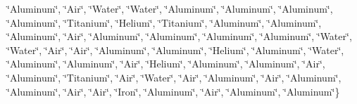\begin{DoxyCompactItemize}
\char`\"{}Aluminum\char`\"{}, \char`\"{}Air\char`\"{}, \char`\"{}Water\char`\"{}, \char`\"{}Water\char`\"{}, \char`\"{}Aluminum\char`\"{}, \char`\"{}Aluminum\char`\"{}, \char`\"{}Aluminum\char`\"{}, \char`\"{}Aluminum\char`\"{}, \char`\"{}Titanium\char`\"{}, \char`\"{}Helium\char`\"{}, \char`\"{}Titanium\char`\"{}, \char`\"{}Aluminum\char`\"{}, \char`\"{}Aluminum\char`\"{}, \char`\"{}Aluminum\char`\"{}, \char`\"{}Air\char`\"{}, \char`\"{}Aluminum\char`\"{}, \char`\"{}Aluminum\char`\"{}, \char`\"{}Aluminum\char`\"{}, \char`\"{}Aluminum\char`\"{}, \char`\"{}Water\char`\"{}, \char`\"{}Water\char`\"{}, \char`\"{}Air\char`\"{}, \char`\"{}Air\char`\"{}, \char`\"{}Aluminum\char`\"{}, \char`\"{}Aluminum\char`\"{}, \char`\"{}Helium\char`\"{}, \char`\"{}Aluminum\char`\"{}, \char`\"{}Water\char`\"{}, \char`\"{}Aluminum\char`\"{}, \char`\"{}Aluminum\char`\"{}, \char`\"{}Air\char`\"{}, \char`\"{}Helium\char`\"{}, \char`\"{}Aluminum\char`\"{}, \char`\"{}Aluminum\char`\"{}, \char`\"{}Air\char`\"{}, \char`\"{}Aluminum\char`\"{}, \char`\"{}Titanium\char`\"{}, \char`\"{}Air\char`\"{}, \char`\"{}Water\char`\"{}, \char`\"{}Air\char`\"{}, \char`\"{}Aluminum\char`\"{}, \char`\"{}Air\char`\"{}, \char`\"{}Aluminum\char`\"{}, \char`\"{}Aluminum\char`\"{}, \char`\"{}Air\char`\"{}, \char`\"{}Air\char`\"{}, \char`\"{}Iron\char`\"{}, \char`\"{}Aluminum\char`\"{}, \char`\"{}Air\char`\"{}, \char`\"{}Aluminum\char`\"{}, \char`\"{}Aluminum\char`\"{}\}
\item 

\end{DoxyCompactItemize}
